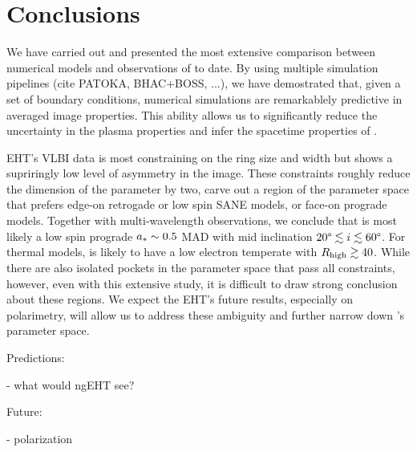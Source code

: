 \section{Conclusions}\label{sec:conclusions}


We have carried out and presented the most extensive comparison
between numerical models and observations of \sgra to date.
By using multiple simulation pipelines (cite PATOKA, BHAC+BOSS, ...),
we have demostrated that, given a set of boundary conditions,
numerical simulations are remarkablely predictive in averaged image
properties.
This ability allows us to significantly reduce the uncertainty in the
plasma properties and infer the spacetime properties of \sgra.

EHT's VLBI data is most constraining on the ring size and width but
shows a supriringly low level of asymmetry in the image.
These constraints roughly reduce the dimension of the parameter by
two, carve out a region of the parameter space that prefers edge-on
retrogade or low spin SANE models, or face-on prograde models.
Together with multi-wavelength observations, we conclude that \sgra is
most likely a low spin prograde $a_* \sim 0.5$ MAD with mid
inclination $20\degree \lesssim i \lesssim 60\degree$.
For thermal models, \sgra is likely to have a low electron temperate
with $R_\mathrm{high} \gtrsim 40$.
While there are also isolated pockets in the parameter space that pass
all constraints, however, even with this extensive study, it is
difficult to draw strong conclusion about these regions.
We expect the EHT's future results, especially on polarimetry, will
allow us to address these ambiguity and further narrow down \sgra's
parameter space.



Predictions:

- what would ngEHT see?

Future:

- polarization
